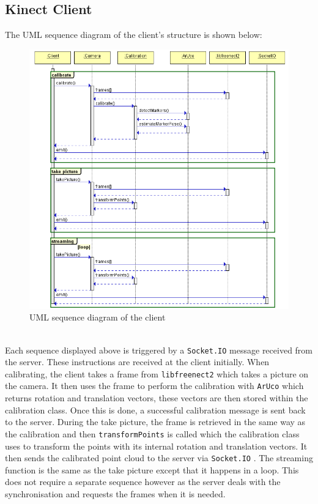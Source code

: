 \documentclass{article}
\begin{document}
\subsection{Kinect Client}
The UML sequence diagram of the client's structure is shown below:
\begin{figure}[h]
  \centering
  \includegraphics[scale=0.6]{clientUML}
  \caption{UML sequence diagram of the client}
\end{figure}
\\
Each sequence displayed above is triggered by a \texttt{Socket.IO} \cite{socketio} message received from the server. These instructions are received at the client initially. When calibrating, the client takes a frame from \texttt{libfreenect2} \cite{libfreenect} which takes a picture on the camera. It then uses the frame to perform the calibration with \texttt{ArUco} \cite{aruco} which returns rotation and translation vectors, these vectors are then stored within the calibration class. Once this is done, a successful calibration message is sent back to the server. During the take picture, the frame is retrieved in the same way as the calibration and then \texttt{transformPoints} is called which the calibration class uses to transform the points with its internal rotation and translation vectors. It then sends the calibrated point cloud to the server via \texttt{Socket.IO} \cite{socketio}. The streaming function is the same as the take picture except that it happens in a loop. This does not require a separate sequence however as the server deals with the synchronisation and requests the frames when it is needed.
\end{document}
